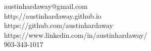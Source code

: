 \documentclass[margin,line]{resume}
\begin{document}
{
    \hfill austinhardaway@gmail.com       \vspace{0mm}\\\vspace{0mm}%
    \hfill http://austinhardaway.github.io         \vspace{0mm}\\\vspace{0mm}%
    \hfill https://github.com/austinhardaway \vspace{0mm}\\\vspace{0mm}%
    \hfill https://www.linkedin.com/in/austinhardaway/ \vspace{0mm}\\\vspace{0mm}%
    \hfill 903-343-1017 \vspace{0mm}\\\vspace{-9mm}%

}
\end{document}
